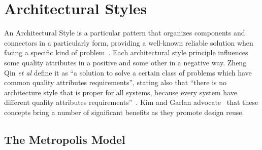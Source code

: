 




%
%  





\section{Architectural Styles} \label{sec:arch-styles}

An Architectural Style is a particular pattern that organizes components and connectors in a particularly form, providing a well-known reliable solution when facing a specific kind of problem~\citep{Kazman}. Each architectural style principle influences some quality attributes in a positive and some other in a negative way. Zheng Qin \textit{et al} define it as ``a solution to solve a certain class of problems which have common quality attributes requirements'', stating also that ``there is no architecture style that is proper for all systems, because every system have different quality attributes requirements''~\citep{Qin2008}. Kim and Garlan advocate~\citep{Kim2010} that these concepts bring a number of significant benefits as they promote design reuse.

\subsection{The Metropolis Model}

